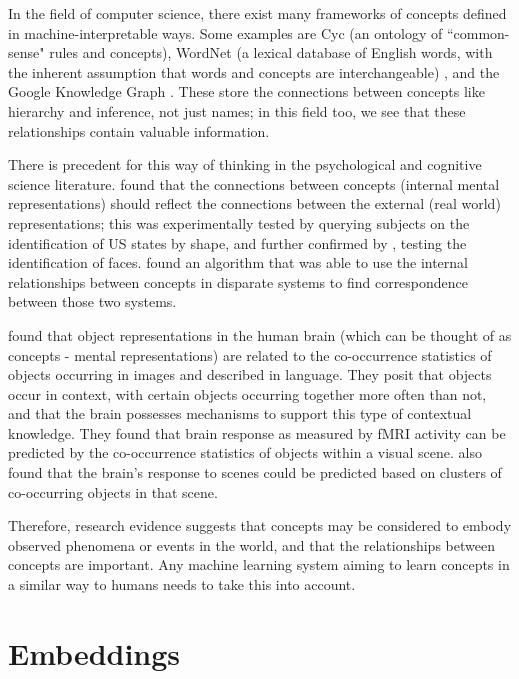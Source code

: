 In the field of computer science, there exist many frameworks of concepts defined in machine-interpretable ways. Some examples are Cyc \cite{Cyc} (an ontology of ``common-sense" rules and concepts), WordNet (a lexical database of English words, with the inherent assumption that words and concepts are interchangeable) \cite{WordNet}, and the Google Knowledge Graph \cite{KnowledgeGraphs}. These store the connections between concepts like hierarchy and inference, not just names; in this field too, we see that these relationships contain valuable information. 

There is precedent for this way of thinking in the psychological and cognitive science literature. \cite{SHEPARD19701} found that the connections between concepts (internal mental representations) should reflect the connections between the external (real world) representations; this was experimentally tested by querying subjects on the identification of US states by shape, and further confirmed by \cite{SecondOrderIsomorphismFaces}, testing the identification of faces. \cite{GOLDSTONE2002295} found an algorithm that was able to use the internal relationships between concepts in disparate systems to find correspondence between those two systems. 

\cite{CoocurrenceVisionLanguage2021} found that object representations in the human brain (which can be thought of as concepts - mental representations) are related to the co-occurrence statistics of objects occurring in images and described in language. They posit that objects occur in context, with certain objects occurring together more often than not, and that the brain possesses mechanisms to support this type of contextual knowledge. They found that brain response as measured by fMRI activity can be predicted by the co-occurrence statistics of objects within a visual scene. \cite{STANSBURY20131025} also found that the brain's response to scenes could be predicted based on clusters of co-occurring objects in that scene. 

Therefore, research evidence suggests that concepts may be considered to embody observed phenomena or events in the world, and that the relationships between concepts are important. Any machine learning system aiming to learn concepts in a similar way to humans needs to take this into account. 

\section{Embeddings}

